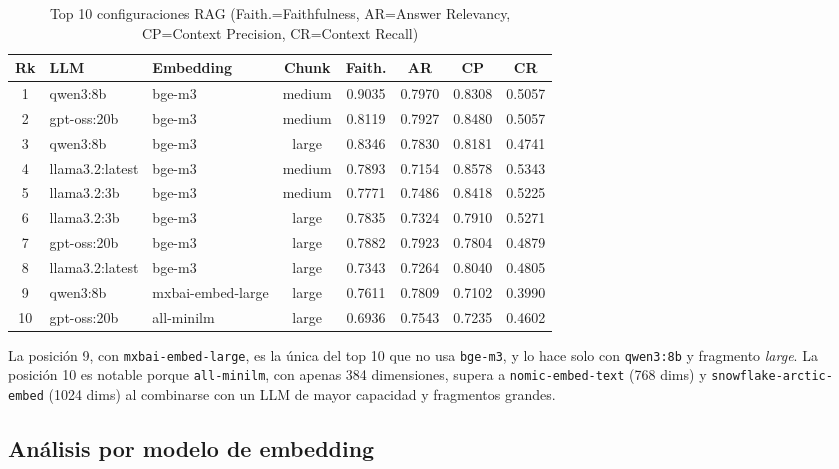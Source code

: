 \documentclass{article}
\begin{document}
\begin{table}[H]
\centering
\small
\begin{tabular}{|c|l|l|c|c|c|c|c|}
\hline
\textbf{Rk} & \textbf{LLM} & \textbf{Embedding} & \textbf{Chunk} & \textbf{Faith.} & \textbf{AR} & \textbf{CP} & \textbf{CR} \\
\hline
1  & qwen3:8b        & bge-m3            & medium & 0.9035 & 0.7970 & 0.8308 & 0.5057 \\
2  & gpt-oss:20b     & bge-m3            & medium & 0.8119 & 0.7927 & 0.8480 & 0.5057 \\
3  & qwen3:8b        & bge-m3            & large  & 0.8346 & 0.7830 & 0.8181 & 0.4741 \\
4  & llama3.2:latest & bge-m3            & medium & 0.7893 & 0.7154 & 0.8578 & 0.5343 \\
5  & llama3.2:3b     & bge-m3            & medium & 0.7771 & 0.7486 & 0.8418 & 0.5225 \\
6  & llama3.2:3b     & bge-m3            & large  & 0.7835 & 0.7324 & 0.7910 & 0.5271 \\
7  & gpt-oss:20b     & bge-m3            & large  & 0.7882 & 0.7923 & 0.7804 & 0.4879 \\
8  & llama3.2:latest & bge-m3            & large  & 0.7343 & 0.7264 & 0.8040 & 0.4805 \\
9  & qwen3:8b        & mxbai-embed-large & large  & 0.7611 & 0.7809 & 0.7102 & 0.3990 \\
10 & gpt-oss:20b     & all-minilm        & large  & 0.6936 & 0.7543 & 0.7235 & 0.4602 \\
\hline
\end{tabular}
\caption{Top 10 configuraciones RAG (Faith.=Faithfulness, AR=Answer Relevancy, CP=Context Precision, CR=Context Recall)}
\label{tab:top10}
\end{table}

La posición 9, con \texttt{mxbai-embed-large}, es la única del top 10 que no
usa \texttt{bge-m3}, y lo hace solo con \texttt{qwen3:8b} y fragmento
\textit{large}. La posición 10 es notable porque \texttt{all-minilm}, con
apenas 384 dimensiones, supera a \texttt{nomic-embed-text} (768 dims) y
\texttt{snowflake-arctic-embed} (1024 dims) al combinarse con un LLM de mayor
capacidad y fragmentos grandes.

\subsection{Análisis por modelo de embedding}
\end{document}
